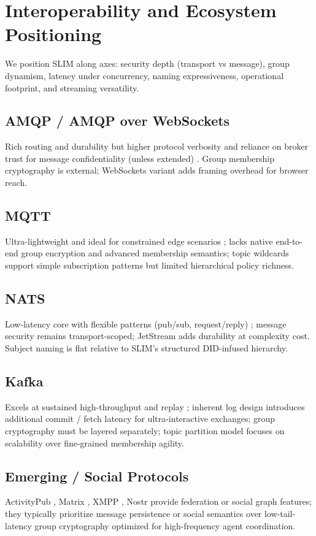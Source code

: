 \documentclass{article}
\theoremstyle{definition}
\theoremstyle{remark}
\begin{document}
\section{Interoperability and Ecosystem Positioning}\label{sec:comparison}
We position SLIM along axes: security depth (transport vs message), group dynamism, latency under concurrency, naming expressiveness, operational footprint, and streaming versatility.
\subsection{AMQP / AMQP over WebSockets}
Rich routing and durability but higher protocol verbosity and reliance on broker trust for message confidentiality (unless extended) \citep{amqp10}. Group membership cryptography is external; WebSockets variant adds framing overhead for browser reach.
\subsection{MQTT}
Ultra-lightweight and ideal for constrained edge scenarios \citep{mqtt311}; lacks native end-to-end group encryption and advanced membership semantics; topic wildcards support simple subscription patterns but limited hierarchical policy richness.
\subsection{NATS}
Low-latency core with flexible patterns (pub/sub, request/reply) \citep{nats}; message security remains transport-scoped; JetStream adds durability at complexity cost. Subject naming is flat relative to SLIM's structured DID-infused hierarchy.
\subsection{Kafka}
Excels at sustained high-throughput and replay \citep{kafka}; inherent log design introduces additional commit / fetch latency for ultra-interactive exchanges; group cryptography must be layered separately; topic partition model focuses on scalability over fine-grained membership agility.
\subsection{Emerging / Social Protocols}
ActivityPub \citep{activitypub}, Matrix \citep{matrixspec}, XMPP \citep{xmpp-core}, Nostr \citep{nostr} provide federation or social graph features; they typically prioritize message persistence or social semantics over low-tail-latency group cryptography optimized for high-frequency agent coordination.
\end{document}
